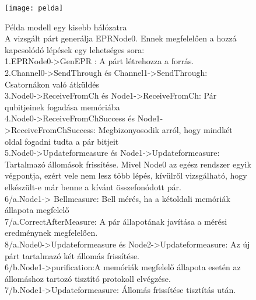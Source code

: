 \begin{figure}
\centering
\texttt{[image: pelda]}
\caption[Példa modell egy kisebb hálózatra]{Példa modell egy kisebb hálózatra\\
A vizsgált párt generálja EPRNode0. Ennek megfelelően a hozzá kapcsolódó lépések egy lehetséges sora: \\
1.EPRNode0->GenEPR : A párt létrehozza a forrás.\\
2.Channel0->SendThrough és Channel1->SendThrough: Csatornákon való átküldés\\
3.Node0->ReceiveFromCh és Node1->ReceiveFromCh: Pár qubitjeinek fogadása memóriába\\
4.Node0->ReceiveFromChSuccess és Node1->ReceiveFromChSuccess: Megbizonyosodik arról, hogy mindkét oldal fogadni tudta a pár bitjeit\\
5.Node0->Updateformeasure és Node1->Updateformeasure: Tartalmazó állomások frissítése. Mivel Node0 az egész rendszer egyik végpontja, ezért vele nem lesz több lépés, kívülről vizsgálható, hogy elkészült-e már benne a kívánt összefonódott pár.\\
6/a.Node1-> Bellmeasure: Bell mérés, ha a kétoldali memóriák állapota megfelelő\\
7/a.CorrectAfterMeasure: A pár állapotának javítása a mérési eredménynek megfelelően.\\
8/a.Node0->Updateformeasure és Node2->Updateformeasure: Az új párt tartalmazó két állomás frissítése.\\
6/b.Node1->purification:A memóriák megfelelő állapota esetén az állomáshoz tartozó tisztító protokoll elvégzése.\\
7/b.Node1->Updateformeasure: Állomás frissítése tisztítás után.
}
\end{figure}

